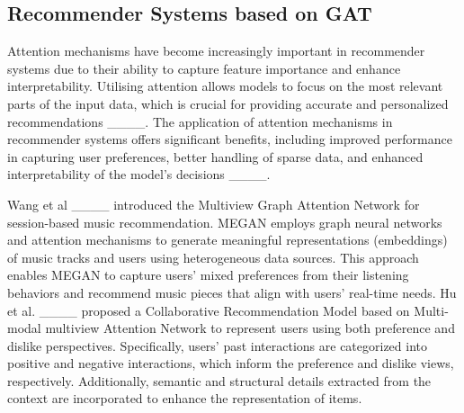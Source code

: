 \subsection{Recommender Systems based on GAT}

    Attention mechanisms have become increasingly important in recommender systems due to their ability to capture feature importance and enhance interpretability. Utilising attention allows models to focus on the most relevant parts of the input data, which is crucial for providing accurate and personalized recommendations ____. The application of attention mechanisms in recommender systems offers significant benefits, including improved performance in capturing user preferences, better handling of sparse data, and enhanced interpretability of the model's decisions ____. 
    
    Wang et al ____ introduced the Multiview Graph Attention Network   for session-based music recommendation. MEGAN employs graph neural networks and attention mechanisms to generate meaningful representations (embeddings) of music tracks and users using heterogeneous data sources. This approach enables MEGAN to capture users' mixed preferences from their listening behaviors and recommend music pieces that align with users' real-time needs. Hu et al. ____ proposed a Collaborative Recommendation Model based on Multi-modal multiview Attention Network to represent users using both preference and dislike perspectives. Specifically, users' past interactions are categorized into positive and negative interactions, which inform the preference and dislike views, respectively. Additionally, semantic and structural details extracted from the context are incorporated to enhance the representation of items.
    
